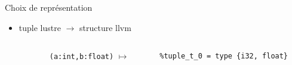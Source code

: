 \documentclass{beamer} %
\newcommand{\ocaml}[1]{\texttt{#1}}
\begin{document}
\begin{frame}[fragile]{Choix de représentation}
    \begin{itemize}
        \item tuple lustre $\to$ structure llvm \\


            \begin{columns}

                \begin{column}{0.1\textwidth}
                \end{column}
                \begin{column}{0.3\textwidth}

                    \ocaml{(a:int,b:float)} $\mapsto$
                \end{column}
                \begin{column}{0.6\textwidth}  %
                        \begin{verbatim}
%tuple_t_0 = type {i32, float}
                        \end{verbatim}
                \end{column}
            \end{columns}
    \end{itemize}
\end{frame}
\end{document}
